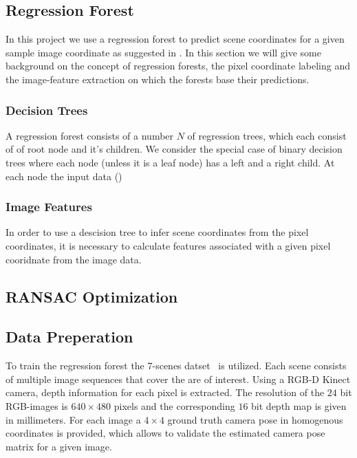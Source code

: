 \documentclass[final]{cvpr}
\begin{document}
\subsection{Regression Forest}

In this project we use a regression forest to predict scene coordinates for a given
sample image coordinate as suggested in \cite{shotton2013}. In this section we will
give some background on the concept of regression forests, the pixel coordinate
labeling and the image-feature extraction on which the forests base their predictions.\\

\subsubsection{Decision Trees}
A regression forest consists of a number $N$ of regression trees, which each consist of
of root node and it's children. We consider the special case of binary decision trees
where each node (unless it is a leaf node) has a left and a right child. At each node
the input data ()

\subsubsection{Image Features}
In order to use a descision tree to infer scene coordinates from the pixel coordinates,
it is necessary to calculate features associated with a given pixel cooridnate from the
image data. 


\subsection{RANSAC Optimization}

\subsection{Data Preperation}
To train the regression forest the 7-scenes datset~\cite{glocker2013} is utilized. 
Each scene consists of multiple image sequences that cover the are of interest. Using a RGB-D 
Kinect camera, depth information for each pixel is extracted. The resolution of the $24$ 
bit RGB-images is $640\times480$ pixels and the corresponding $16$ bit depth map is given 
in millimeters. For each image a $4\times4$ ground truth camera pose in homogenous coordinates 
is provided, which allows to validate the estimated camera pose matrix for a given image. 
\end{document}
